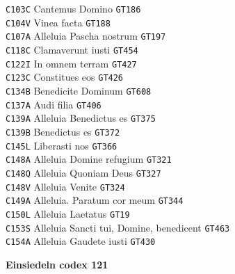 \documentclass[a4paper]{article}
\begin{document}
{\begin{multicols}{2}
\texttt{C103C} Cantemus Domino \texttt{GT186}\\
\texttt{C104V} Vinea facta \texttt{GT188}\\
\texttt{C107A} Alleluia Pascha nostrum \texttt{GT197}\\
\texttt{C118C} Clamaverunt iusti \texttt{GT454}\\
\texttt{C122I} In omnem terram \texttt{GT427}\\
\texttt{C123C} Constitues eos \texttt{GT426}\\
\texttt{C134B} Benedicite Dominum \texttt{GT608}\\
\texttt{C137A} Audi filia \texttt{GT406}\\
\texttt{C139A} Alleluia Benedictus es \texttt{GT375}\\
\texttt{C139B} Benedictus es \texttt{GT372}\\
\texttt{C145L} Liberasti nos \texttt{GT366}\\
\texttt{C148A} Alleluia Domine refugium \texttt{GT321}\\
\texttt{C148Q} Alleluia Quoniam Deus \texttt{GT327}\\
\texttt{C148V} Alleluia Venite \texttt{GT324}\\
\texttt{C149A} Alleluia. Paratum cor meum \texttt{GT344}\\
\texttt{C150L} Alleluia Laetatus \texttt{GT19}\\
\texttt{C153S} Alleluia Sancti tui, Domine, benedicent \texttt{GT463}\\
\texttt{C154A} Alleluia Gaudete iusti \texttt{GT430}

\noindent\textbf{Einsiedeln codex 121}


\end{multicols}}
\end{document}
